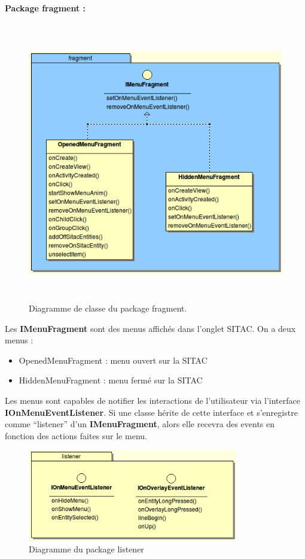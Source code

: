 \documentclass{article}
\begin{document}
\paragraph{Package fragment :}
\begin{figure}[htbp]
\begin{center}
\includegraphics[width=391pt, height=344pt]{doc_dev-fig004.png}
\caption{Diagramme de classe du package fragment.}
\end{center}
\end{figure}

Les \textbf{IMenuFragment} sont des menus affichés dans l’onglet SITAC. On a deux menus :
\begin{itemize}
\item OpenedMenuFragment : menu ouvert sur la SITAC
\item HiddenMenuFragment : menu fermé sur la SITAC
\end{itemize}
Les menus sont capables de notifier les interactions de l’utilisateur via l’interface \textbf{IOnMenuEventListener}. Si une classe hérite de cette interface et s’enregistre comme “listener” d’un \textbf{IMenuFragment}, alors elle recevra des events en fonction des actions faites sur le menu.

\newpage
\begin{figure}[htbp]
\begin{center}
\includegraphics[width=260pt]{doc_dev-fig005.png}
\caption{Diagramme du package listener}
\end{center}
\end{figure}
\end{document}
